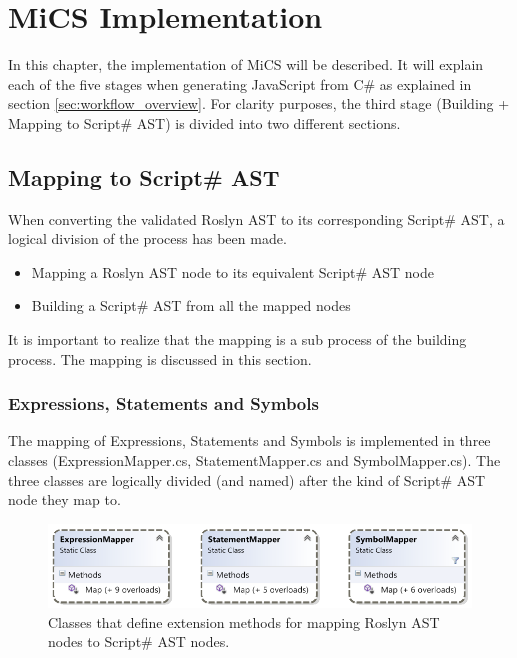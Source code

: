 \chapter{MiCS Implementation}
	In this chapter, the implementation of MiCS will be described. It will explain each of the five stages when generating JavaScript from C\# as explained in section \ref{sec:workflow_overview}. For clarity purposes, the third stage (Building + Mapping to Script\# AST) is divided into two different sections.






\section{Mapping to Script\# AST} %
\label{sec:mapping_to_scriptsharp_ast}
	When converting the validated Roslyn AST to its corresponding Script\# AST, a logical division of the process has been made. 

	\begin{itemize}
		\item Mapping a Roslyn AST node to its equivalent Script\# AST node
		\item Building a Script\# AST from all the mapped nodes
	\end{itemize}

	It is important to realize that the mapping is a sub process of the building process. The mapping is discussed in this section. 

	\subsection{Expressions, Statements and Symbols} %
	\label{sub:subsection_mapping_to_scriptsharp_expressions_statements_and_symbols}
		The mapping of Expressions, Statements and Symbols is implemented in three classes (ExpressionMapper.cs, StatementMapper.cs and SymbolMapper.cs). The three classes are logically divided (and named) after the kind of Script\# AST node they map to. 

		\begin{figure}[H]
			\begin{center}
				\centerline{\includegraphics[width=14cm]{resources/images/MapperClasses.png}}
			\end{center}
			\caption{Classes that define extension methods for mapping Roslyn AST nodes to Script\# AST nodes.}
			\label{mapperClasses}
		\end{figure}

